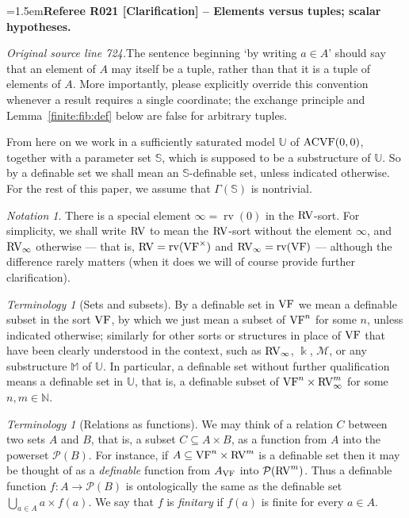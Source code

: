 \documentclass[12pt]{amsart}
\newcommand{\RefereeRemark}[4]{%
  \par\medskip\begingroup\normalfont\small\color{RefereePurple}%
  \emergencystretch=1.5em\noindent\textbf{Referee R#1 [#2] -- #3.}\par\nobreak\noindent #4\par
  \endgroup\medskip
}
\newcommand{\memph}[1]{{\color{magenta}\emph{#1}}}
\theoremstyle{plain}
\theoremstyle{definition}
\theoremstyle{remark}
\newtheorem{ter}[thm]{Terminology}
\newtheorem{nota}[thm]{Notation}
\numberwithin{equation}{section}
\theoremstyle{plain}
\newcommand{\VF}{\textup{VF}}
\newcommand{\ACVF}{\textup{ACVF}}
\newcommand{\RV}{\textup{RV}}
\newcommand{\MM}{\mdl M}
\DeclareMathOperator{\K}{\mathds{k}}
\newcommand{\N}{\mathds{N}}
\newcommand{\0}{\emptyset}
\newcommand{\mdl}[1]{\mathcal{#1}}  %
\newcommand{\bb}[1]{\mathbb{#1}}
\newcommand{\fun}{\longrightarrow}
\newcommand{\sub}{\subseteq}
\DeclareMathOperator{\rv}{rv}
\begin{document}
\RefereeRemark{021}{Clarification}{Elements versus tuples; scalar hypotheses}{%
\textit{Original source line 724.}\quad The sentence beginning `by writing $a\in A$' should say that an element of $A$ may itself be a tuple, rather than that it is a tuple of elements of $A$. More importantly, please explicitly override this convention whenever a result requires a single coordinate; the exchange principle and Lemma~\ref{finite:fib:def} below are false for arbitrary tuples.
}

From here on we work in a sufficiently saturated model $\bb U$ of $\ACVF(0,0)$, together with a parameter  set $\mathbb{S}$, which is supposed to be a substructure of $\bb U$. So by a definable set  we shall mean an $\bb S$-definable set, unless indicated otherwise. For the rest of this paper, we assume that $\Gamma(\mathbb S)$ is nontrivial.

\begin{nota}
There is a special element $\infty = \rv(0)$ in the $\RV$-sort. For simplicity, we shall write $\RV$ to mean the $\RV$-sort without the element $\infty$, and $\RV_\infty$ otherwise --- that is, $\RV = \rv(\VF^\times)$ and $\RV_\infty = \rv(\VF)$ --- although the difference rarely matters (when it does we will of course provide further clarification).
\end{nota}

\begin{ter}[Sets and subsets]\label{nota:sub}
By a definable set in $\VF$ we mean a definable subset in the sort $\VF$, by which we just mean a subset of $\VF^n$ for some $n$, unless indicated otherwise; similarly for other sorts or structures  in place of $\VF$ that have been clearly understood in the context, such as $\RV_\infty$, $\K$, $\MM$, or any substructure $\bb M$ of $\bb U$. In particular,  a definable set without further qualification means a definable set in $\bb U$, that is, a  definable subset of $\VF^n \times \RV^m_\infty$ for some $n, m \in \N$.
\end{ter}

\begin{ter}[Relations as functions]
We may think of a relation $C$ between two sets $A$ and $B$, that is, a subset $C \sub A \times B$, as a function from $A$ into the powerset $\mdl P(B)$. For instance, if $A \sub \VF^n \times \RV^m$ is a definable set then it may be thought of as a \memph{definable} function from $A_{\VF}$ into  $\mdl P(\RV^m)$. Thus a definable function $f : A \fun \mdl P(B)$ is ontologically the same as the definable set $\bigcup_{a \in A} a \times f(a)$. We say that $f$ is \memph{finitary} if $f(a)$ is finite for every $a \in A$.
\end{ter}
\end{document}
